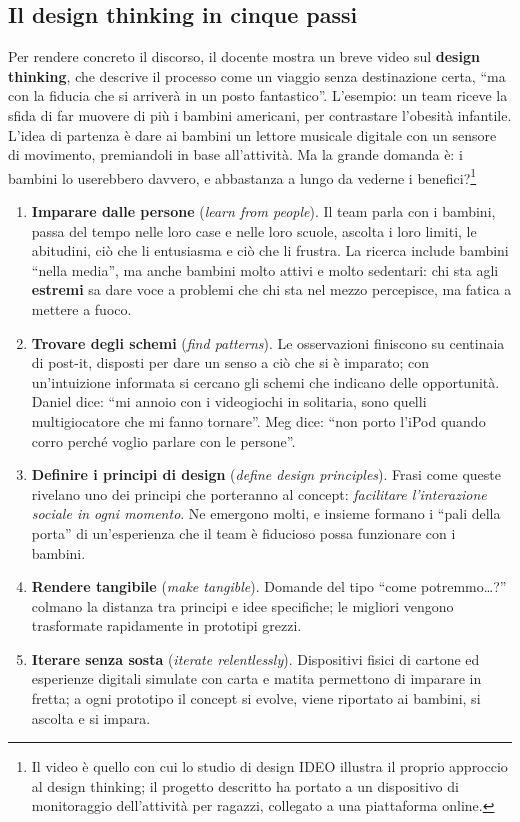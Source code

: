 \subsection{Il design thinking in cinque passi}

Per rendere concreto il discorso, il docente mostra un breve video sul
\textbf{design thinking}, che descrive il processo come un viaggio senza
destinazione certa, ``ma con la fiducia che si arriverà in un posto
fantastico''. L'esempio: un team riceve la sfida di far muovere di più i
bambini americani, per contrastare l'obesità infantile. L'idea di partenza è
dare ai bambini un lettore musicale digitale con un sensore di movimento,
premiandoli in base all'attività. Ma la grande domanda è: i bambini lo
userebbero davvero, e abbastanza a lungo da vederne i benefici?\footnote{Il
video è quello con cui lo studio di design IDEO illustra il proprio approccio
al design thinking; il progetto descritto ha portato a un dispositivo di
monitoraggio dell'attività per ragazzi, collegato a una piattaforma online.}

\begin{enumerate}
  \item \textbf{Imparare dalle persone} (\emph{learn from people}). Il team
        parla con i bambini, passa del tempo nelle loro case e nelle loro
        scuole, ascolta i loro limiti, le abitudini, ciò che li entusiasma e
        ciò che li frustra. La ricerca include bambini ``nella media'', ma
        anche bambini molto attivi e molto sedentari: chi sta agli
        \textbf{estremi} sa dare voce a problemi che chi sta nel mezzo
        percepisce, ma fatica a mettere a fuoco.
  \item \textbf{Trovare degli schemi} (\emph{find patterns}). Le osservazioni
        finiscono su centinaia di post-it, disposti per dare un senso a ciò
        che si è imparato; con un'intuizione informata si cercano gli schemi
        che indicano delle opportunità. Daniel dice: ``mi annoio con i
        videogiochi in solitaria, sono quelli multigiocatore che mi fanno
        tornare''. Meg dice: ``non porto l'iPod quando corro perché voglio
        parlare con le persone''.
  \item \textbf{Definire i principi di design} (\emph{define design
        principles}). Frasi come queste rivelano uno dei principi che
        porteranno al concept: \emph{facilitare l'interazione sociale in ogni
        momento}. Ne emergono molti, e insieme formano i ``pali della porta''
        di un'esperienza che il team è fiducioso possa funzionare con i
        bambini.
  \item \textbf{Rendere tangibile} (\emph{make tangible}). Domande del tipo
        ``come potremmo\dots?'' colmano la distanza tra principi e idee
        specifiche; le migliori vengono trasformate rapidamente in prototipi
        grezzi.
  \item \textbf{Iterare senza sosta} (\emph{iterate relentlessly}).
        Dispositivi fisici di cartone ed esperienze digitali simulate con
        carta e matita permettono di imparare in fretta; a ogni prototipo il
        concept si evolve, viene riportato ai bambini, si ascolta e si impara.
\end{enumerate}

